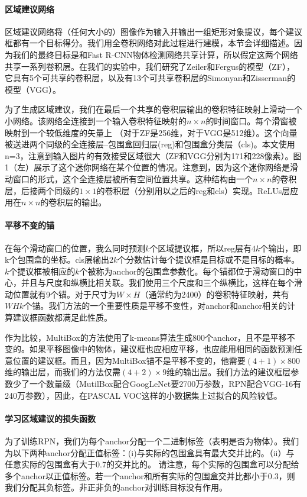 \documentclass[12pt,a4paper,titlepage]{article}
\begin{document}
\paragraph{区域建议网络}
区域建议网络将（任何大小的）图像作为输入并输出一组矩形对象提议，每个建议框都有一个目标得分。我们用全卷积网络对此过程进行建模，本节会详细描述。因为我们的最终目标是和Fast R-CNN物体检测网络共享计算，所以假定这两个网络共享一系列卷积层。在我们的实验中，我们研究了Zeiler和Fergus的模型（ZF），它具有5个可共享的卷积层，以及有13个可共享卷积层的Simonyan和Zisserman的模型（VGG）。\par

为了生成区域建议，我们在最后一个共享的卷积层输出的卷积特征映射上滑动一个小网络。该网络全连接到一个输入卷积特征映射的$n \times n$的时间窗口。每个滑窗被映射到一个较低维度的矢量上 （对于ZF是256维，对于VGG是512维）。这个向量被送进两个同级的全连接层--包围盒回归层(reg)和包围盒分类层（cls)。本文使用n=3，注意到输入图片的有效接受区域很大（ZF和VGG分别为171和228像素）。图1（左）展示了这个迷你网络在某个位置的情况。注意到，因为这个迷你网络是滑动窗口的形式，这个全连接层被所有空间位置共享。这种结构由一个$n \times n$的卷积层，后接两个同级的$1 \times 1$的卷积层（分别用以之后的reg和cls）实现。ReLUs层应用在$n \times n$的卷积层的输出。

\paragraph{平移不变的锚}
在每个滑动窗口的位置，我么同时预测$k$个区域提议框，所以reg层有$4k$个输出，即k个包围盒的坐标。cls层输出$2k$个分数估计每个提议框是目标或不是目标的概率。$k$个提议框被相应的$k$个被称为anchor的包围盒参数化。每个锚都位于滑动窗口的中心，并且与尺度和纵横比相关联。我们使用三个尺度和三个纵横比，这样在每个滑动位置就有9个锚。对于尺寸为$W \times H$（通常约为2400）的卷积特征映射，共有$WHk$个锚。我们方法的一个重要性质是平移不变性，对anchor和anchor相关的计算建议框函数都满足此性质。\par

作为比较，MultiBox的方法使用了k-means算法生成800个anchor，且不是平移不变的。如果平移图像中的物体，建议框也应相应平移，也应能用相同的函数预测任意位置的建议框。而且，因为MultiBox锚不是平移不变的，他需要$(4+1) \times    800$维的输出层，而我们的方法仅需$(4+2) \times 9$维的输出层。我们方法的建议框层参数少了一个数量级（MutilBox配合GoogLeNet要2700万参数，RPN配合VGG-16有240万参数），因此，在PASCAL VOC这样的小数据集上过拟合的风险较低。

\paragraph{学习区域建议的损失函数}
为了训练RPN，我们为每个anchor分配一个二进制标签（表明是否为物体）。我们为以下两种anchor分配正值标签：(i)与实际的包围盒具有最大交并比的。（ii）与任意实际的包围盒有大于0.7的交并比的。 请注意，每个实际的包围盒可以分配给多个anchor以正值标签。若一个anchor和所有实际的包围盒交并比都小于0.3，则我们分配其负标签。非正非负的anchor对训练目标没有作用。\par
\end{document}
